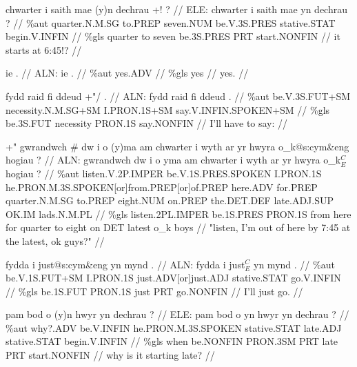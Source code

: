 \documentclass[a4paper,10pt]{article}
\begin{document}
\ex
\begingl[lingstyle=gergl]
\glchat chwarter i saith mae (y)n dechrau +! ? //
\glsurface ELE:  chwarter i saith mae yn dechrau ?  //
\glauto \%aut  quarter{\scriptsize .N.M.SG} to{\scriptsize .PREP} seven{\scriptsize .NUM} be{\scriptsize .V.3S.PRES} stative{\scriptsize .STAT} begin{\scriptsize .V.INFIN}   //
\glmanual \%gls  quarter to seven be{\scriptsize .3S.PRES} PRT start{\scriptsize .NONFIN}   //
\gleng it starts at 6:45!? //
\endgl
\xe

\ex
\begingl[lingstyle=gergl]
\glchat ie . //
\glsurface ALN:  ie .  //
\glauto \%aut  yes{\scriptsize .ADV}   //
\glmanual \%gls  yes   //
\gleng yes. //
\endgl
\xe

\ex
\begingl[lingstyle=gergl]
\glchat fydd raid fi ddeud +"/ . //
\glsurface ALN:  fydd raid fi ddeud .  //
\glauto \%aut  be{\scriptsize .V.3S.FUT+SM} necessity{\scriptsize .N.M.SG+SM} I{\scriptsize .PRON.1S+SM} say{\scriptsize .V.INFIN.SPOKEN+SM}   //
\glmanual \%gls  be{\scriptsize .3S.FUT} necessity PRON{\scriptsize .1S} say{\scriptsize .NONFIN}   //
\gleng I'll have to say: //
\endgl
\xe

\ex
\begingl[lingstyle=gergl]
\glchat +" gwrandwch \# dw i o (y)ma am chwarter i wyth ar yr hwyra o\_k@s:cym\&eng hogiau ? //
\glsurface ALN:  gwrandwch dw i o yma am chwarter i wyth ar yr hwyra o\_k$^{C}_{E}$ hogiau ?  //
\glauto \%aut  listen{\scriptsize .V.2P.IMPER} be{\scriptsize .V.1S.PRES.SPOKEN} I{\scriptsize .PRON.1S} he{\scriptsize .PRON.M.3S.SPOKEN[or]from.PREP[or]of.PREP} here{\scriptsize .ADV} for{\scriptsize .PREP} quarter{\scriptsize .N.M.SG} to{\scriptsize .PREP} eight{\scriptsize .NUM} on{\scriptsize .PREP} the{\scriptsize .DET.DEF} late{\scriptsize .ADJ.SUP} OK{\scriptsize .IM} lads{\scriptsize .N.M.PL}   //
\glmanual \%gls  listen{\scriptsize .2PL.IMPER} be{\scriptsize .1S.PRES} PRON{\scriptsize .1S} from here for quarter to eight on DET latest o\_k boys   //
\gleng "listen, I'm out of here by 7:45 at the latest, ok guys?" //
\endgl
\xe

\ex
\begingl[lingstyle=gergl]
\glchat fydda i just@s:cym\&eng yn mynd . //
\glsurface ALN:  fydda i just$^{C}_{E}$ yn mynd .  //
\glauto \%aut  be{\scriptsize .V.1S.FUT+SM} I{\scriptsize .PRON.1S} just{\scriptsize .ADV[or]just.ADJ} stative{\scriptsize .STAT} go{\scriptsize .V.INFIN}   //
\glmanual \%gls  be{\scriptsize .1S.FUT} PRON{\scriptsize .1S} just PRT go{\scriptsize .NONFIN}   //
\gleng I'll just go. //
\endgl
\xe

\ex
\begingl[lingstyle=gergl]
\glchat pam bod o (y)n hwyr yn dechrau ? //
\glsurface ELE:  pam bod o yn hwyr yn dechrau ?  //
\glauto \%aut  why?.ADV be{\scriptsize .V.INFIN} he{\scriptsize .PRON.M.3S.SPOKEN} stative{\scriptsize .STAT} late{\scriptsize .ADJ} stative{\scriptsize .STAT} begin{\scriptsize .V.INFIN}   //
\glmanual \%gls  when be{\scriptsize .NONFIN} PRON{\scriptsize .3SM} PRT late PRT start{\scriptsize .NONFIN}   //
\gleng why is it starting late? //
\endgl
\xe
\end{document}
